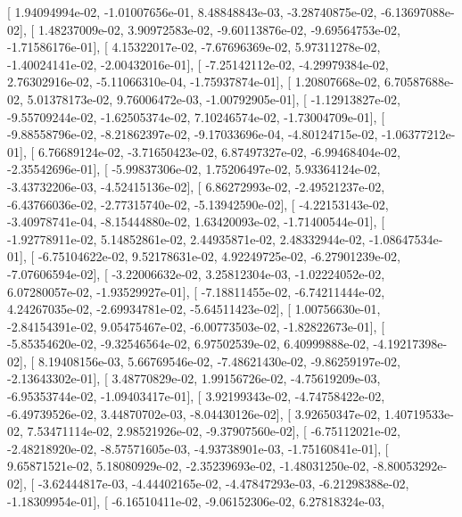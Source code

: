 \documentclass{article}
\begin{document}
       [  1.94094994e-02,  -1.01007656e-01,   8.48848843e-03,
         -3.28740875e-02,  -6.13697088e-02],
       [  1.48237009e-02,   3.90972583e-02,  -9.60113876e-02,
         -9.69564753e-02,  -1.71586176e-01],
       [  4.15322017e-02,  -7.67696369e-02,   5.97311278e-02,
         -1.40024141e-02,  -2.00432016e-01],
       [ -7.25142112e-02,  -4.29979384e-02,   2.76302916e-02,
         -5.11066310e-04,  -1.75937874e-01],
       [  1.20807668e-02,   6.70587688e-02,   5.01378173e-02,
          9.76006472e-03,  -1.00792905e-01],
       [ -1.12913827e-02,  -9.55709244e-02,  -1.62505374e-02,
          7.10246574e-02,  -1.73004709e-01],
       [ -9.88558796e-02,  -8.21862397e-02,  -9.17033696e-04,
         -4.80124715e-02,  -1.06377212e-01],
       [  6.76689124e-02,  -3.71650423e-02,   6.87497327e-02,
         -6.99468404e-02,  -2.35542696e-01],
       [ -5.99837306e-02,   1.75206497e-02,   5.93364124e-02,
         -3.43732206e-03,  -4.52415136e-02],
       [  6.86272993e-02,  -2.49521237e-02,  -6.43766036e-02,
         -2.77315740e-02,  -5.13942590e-02],
       [ -4.22153143e-02,  -3.40978741e-04,  -8.15444880e-02,
          1.63420093e-02,  -1.71400544e-01],
       [ -1.92778911e-02,   5.14852861e-02,   2.44935871e-02,
          2.48332944e-02,  -1.08647534e-01],
       [ -6.75104622e-02,   9.52178631e-02,   4.92249725e-02,
         -6.27901239e-02,  -7.07606594e-02],
       [ -3.22006632e-02,   3.25812304e-03,  -1.02224052e-02,
          6.07280057e-02,  -1.93529927e-01],
       [ -7.18811455e-02,  -6.74211444e-02,   4.24267035e-02,
         -2.69934781e-02,  -5.64511423e-02],
       [  1.00756630e-01,  -2.84154391e-02,   9.05475467e-02,
         -6.00773503e-02,  -1.82822673e-01],
       [ -5.85354620e-02,  -9.32546564e-02,   6.97502539e-02,
          6.40999888e-02,  -4.19217398e-02],
       [  8.19408156e-03,   5.66769546e-02,  -7.48621430e-02,
         -9.86259197e-02,  -2.13643302e-01],
       [  3.48770829e-02,   1.99156726e-02,  -4.75619209e-03,
         -6.95353744e-02,  -1.09403417e-01],
       [  3.92199343e-02,  -4.74758422e-02,  -6.49739526e-02,
          3.44870702e-03,  -8.04430126e-02],
       [  3.92650347e-02,   1.40719533e-02,   7.53471114e-02,
          2.98521926e-02,  -9.37907560e-02],
       [ -6.75112021e-02,  -2.48218920e-02,  -8.57571605e-03,
         -4.93738901e-03,  -1.75160841e-01],
       [  9.65871521e-02,   5.18080929e-02,  -2.35239693e-02,
         -1.48031250e-02,  -8.80053292e-02],
       [ -3.62444817e-03,  -4.44402165e-02,  -4.47847293e-03,
         -6.21298388e-02,  -1.18309954e-01],
       [ -6.16510411e-02,  -9.06152306e-02,   6.27818324e-03,
\end{document}
